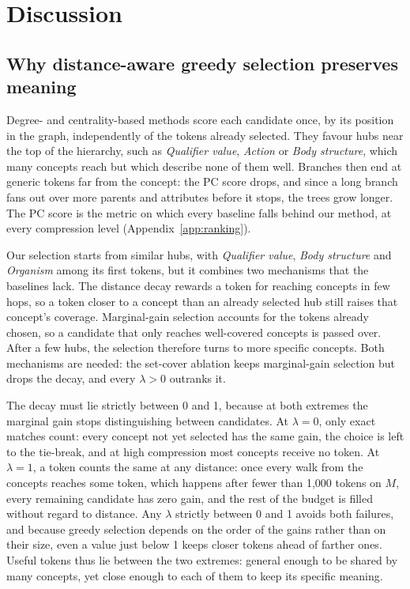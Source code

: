 \section{Discussion}
\label{sec:discussion}

\subsection{Why distance-aware greedy selection preserves meaning}
\label{sec:discussion:why}

Degree- and centrality-based methods score each candidate once, by its position in the graph, independently of the tokens already selected.
They favour hubs near the top of the hierarchy, such as \textit{Qualifier value}, \textit{Action} or \textit{Body structure}, which many concepts reach but which describe none of them well.
Branches then end at generic tokens far from the concept: the PC score drops, and since a long branch fans out over more parents and attributes before it stops, the trees grow longer.
The PC score is the metric on which every baseline falls behind our method, at every compression level (Appendix~\ref{app:ranking}).

Our selection starts from similar hubs, with \textit{Qualifier value}, \textit{Body structure} and \textit{Organism} among its first tokens, but it combines two mechanisms that the baselines lack.
The distance decay rewards a token for reaching concepts in few hops, so a token closer to a concept than an already selected hub still raises that concept's coverage.
Marginal-gain selection accounts for the tokens already chosen, so a candidate that only reaches well-covered concepts is passed over.
After a few hubs, the selection therefore turns to more specific concepts.
Both mechanisms are needed: the set-cover ablation keeps marginal-gain selection but drops the decay, and every $\lambda > 0$ outranks it.

The decay must lie strictly between 0 and 1, because at both extremes the marginal gain stops distinguishing between candidates.
At $\lambda = 0$, only exact matches count: every concept not yet selected has the same gain, the choice is left to the tie-break, and at high compression most concepts receive no token.
At $\lambda = 1$, a token counts the same at any distance: once every walk from the concepts reaches some token, which happens after fewer than 1,000 tokens on $M$, every remaining candidate has zero gain, and the rest of the budget is filled without regard to distance.
Any $\lambda$ strictly between 0 and 1 avoids both failures, and because greedy selection depends on the order of the gains rather than on their size, even a value just below 1 keeps closer tokens ahead of farther ones.
Useful tokens thus lie between the two extremes: general enough to be shared by many concepts, yet close enough to each of them to keep its specific meaning.

